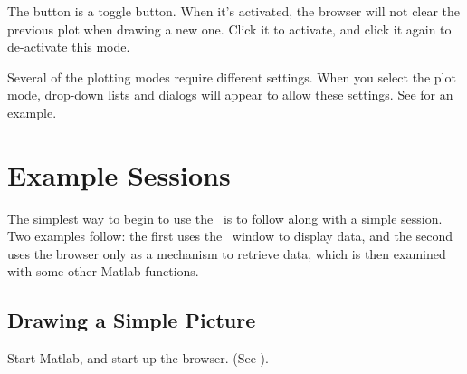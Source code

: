 The  button is a toggle button.  When it's activated,
the browser will not clear the previous plot when drawing a new one.
Click it to activate, and click it again to de-activate this mode.


Several of the plotting modes require different settings.  When you
select the plot mode, drop-down lists and dialogs will appear to allow
these settings.  See  for an example.


\section{Example Sessions}
\label{gui,intro,examples}

The simplest way to begin to use the \GUI\ is to follow along with a
simple session. Two examples follow: the first uses the \GUI\ window
to display data, and the second uses the browser only as a mechanism
to retrieve data, which is then examined with some other Matlab
functions.



\subsection{Drawing a Simple Picture}

Start Matlab, and start up the browser. (See 
).

